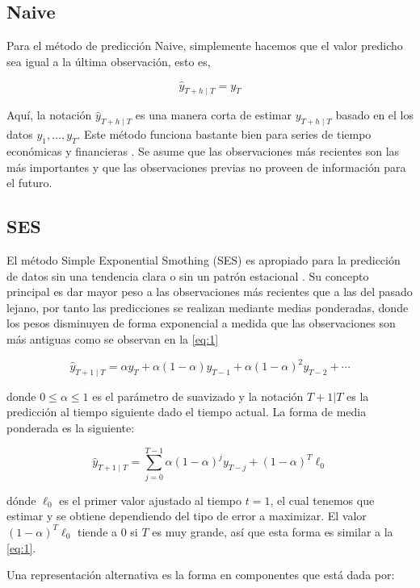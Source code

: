 \subsection{Naive}

Para el método de predicción Naive, simplemente hacemos que el valor predicho sea igual a la última observación, esto es,

\[ \hat{y}_{T+h \mid T}=y_{T} \]

Aquí, la notación $\hat{y}_{T+h \mid T}$ es una manera corta de estimar $y_{T+h \mid T}$ basado en el los datos $y_{1}, \ldots, y_{T}$. Este método funciona bastante bien para series de tiempo económicas y financieras \parencite{hyndmanForecastingPrinciplesPractice2018}.
Se asume que las observaciones más recientes son las más importantes y que las observaciones previas no proveen de información para el futuro.

\subsection{SES}
El método Simple Exponential Smothing (SES) es apropiado para la predicción de datos sin una tendencia clara o sin un patrón estacional \parencite{hyndmanForecastingPrinciplesPractice2018}. Su concepto principal es dar mayor peso a las observaciones más recientes que a las del pasado lejano, por tanto las predicciones se realizan mediante medias ponderadas, donde los pesos disminuyen de forma exponencial a medida que las observaciones son más antiguas como se observan en la \autoref{eq:1}

\begin{equation}
	\hat{y}_{T+1 \mid T}=\alpha y_{T}+\alpha(1-\alpha) y_{T-1}+\alpha(1-\alpha)^{2} y_{T-2}+\cdots
	\label{eq:1}
\end{equation}

donde $0 \leq \alpha \leq 1$ es el parámetro de suavizado y la notación $T+1|T$ es la predicción al tiempo siguiente dado el tiempo actual. La forma de media ponderada es la siguiente:

\[\hat{y}_{T+1 \mid T}=\sum_{j=0}^{T-1} \alpha(1-\alpha)^{j} y_{T-j}+(1-\alpha)^{T} \ell_{0}\]

dónde $\ell_{0}$ es el primer valor ajustado al tiempo $t=1$, el cual tenemos que estimar y se obtiene dependiendo del tipo de error a maximizar. El valor $(1-\alpha)^{T} \ell_{0}$ tiende a $0$ si $T$ es muy grande, así que esta forma es similar a la \autoref{eq:1}. 

Una representación alternativa es la forma en componentes que está dada por:

